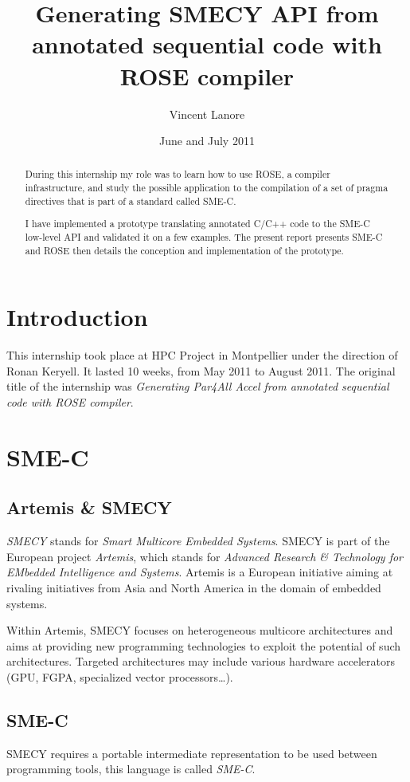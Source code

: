 \documentclass [A4]{article}
\title{Generating SMECY API from annotated sequential code with ROSE compiler}
\author{Vincent \sc Lanore}
\date{June and July 2011}
\begin{document}
	\maketitle
	
	\begin{abstract}
		During this internship my role was to learn how to use ROSE, a compiler infrastructure, and study the possible application to the compilation of a set of pragma directives that is part of a standard called SME-C.
		
		I have implemented a prototype translating annotated C/C++ code to the SME-C low-level API and validated it on a few examples. The present report presents SME-C and ROSE then details the conception and implementation of the prototype.
	\end{abstract}
	
	\tableofcontents
	
\section*{Introduction}
	This internship took place at HPC Project in Montpellier under the direction of Ronan Keryell. It lasted 10 weeks, from May 2011 to August 2011. The original title of the internship was \emph{Generating Par4All Accel from annotated sequential code with ROSE compiler}.
	

\section{SME-C}
	\subsection{Artemis \& SMECY}
 	\emph{SMECY} stands for \emph{Smart Multicore Embedded Systems}. SMECY is part of the European project \emph{Artemis}, which stands for \emph{Advanced Research \& Technology for EMbedded Intelligence and Systems}. Artemis is a European initiative aiming at rivaling initiatives from Asia and North America in the domain of embedded systems.
	
	Within Artemis, SMECY focuses on heterogeneous multicore architectures and aims at providing new programming technologies to exploit the potential of such architectures. Targeted architectures may include various hardware accelerators (GPU, FGPA, specialized vector processors\ldots).

	\subsection{SME-C}
	SMECY requires a portable intermediate representation to be used between programming tools, this language is called \emph{SME-C}.
	
\end{document}
